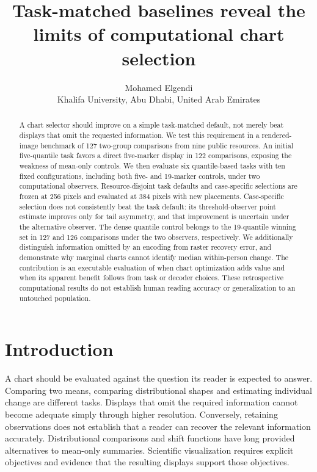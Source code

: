 \documentclass[11pt]{article}
\title{Task-matched baselines reveal the limits of computational chart selection}
\author{Mohamed Elgendi\\Khalifa University, Abu Dhabi, United Arab Emirates}
\date{}
\begin{document}
\maketitle
\begin{abstract}
A chart selector should improve on a simple task-matched default, not merely beat displays that omit the requested information. We test this requirement in a rendered-image benchmark of 127 two-group comparisons from nine public resources. An initial five-quantile task favors a direct five-marker display in 122 comparisons, exposing the weakness of mean-only controls. We then evaluate six quantile-based tasks with ten fixed configurations, including both five- and 19-marker controls, under two computational observers. Resource-disjoint task defaults and case-specific selections are frozen at 256 pixels and evaluated at 384 pixels with new placements. Case-specific selection does not consistently beat the task default: its threshold-observer point estimate improves only for tail asymmetry, and that improvement is uncertain under the alternative observer. The dense quantile control belongs to the 19-quantile winning set in 127 and 126 comparisons under the two observers, respectively. We additionally distinguish information omitted by an encoding from raster recovery error, and demonstrate why marginal charts cannot identify median within-person change. The contribution is an executable evaluation of when chart optimization adds value and when its apparent benefit follows from task or decoder choices. These retrospective computational results do not establish human reading accuracy or generalization to an untouched population.
\end{abstract}

\section*{Introduction}
A chart should be evaluated against the question its reader is expected to answer. Comparing two means, comparing distributional shapes and estimating individual change are different tasks. Displays that omit the required information cannot become adequate simply through higher resolution. Conversely, retaining observations does not establish that a reader can recover the relevant information accurately. Distributional comparisons and shift functions have long provided alternatives to mean-only summaries.\cite{weissgerber2015,rousselet2017} Scientific visualization requires explicit objectives and evidence that the resulting displays support those objectives.\cite{elgendi2017,elgendi2020}
\end{document}
